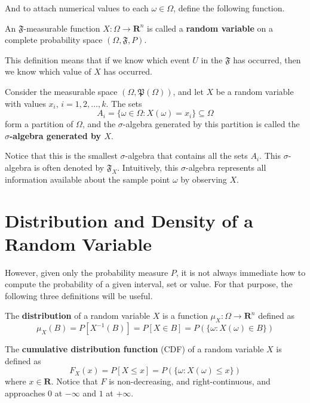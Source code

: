 And to attach numerical values to each $\omega \in \Omega$, define the following function.


\begin{definition}
	An $\mathfrak{F}$-measurable function $X: \Omega \longrightarrow \textbf{R}^n$ is called a \textbf{random variable} on a complete probability space $(\Omega, \mathfrak{F}, P)$. 
\end{definition}

This definition means that if we know which event $U$ in the $\mathfrak{F}$ has occurred, then we know which value of $X$ has occurred. 

Consider the measurable space $(\Omega, \mathfrak{P}(\Omega))$, and let $X$ be a random variable with values $x_i$, $i = 1,2, \ldots, k$. The sets
\[
	A_i = \{ \omega \in \Omega : X(\omega) = x_i \} \subseteq \Omega
\]
form a partition of $\Omega$, and the $\sigma$-algebra generated by this partition is called the \textbf{$\sigma$-algebra generated by $X$}.

Notice that this is the smallest $\sigma$-algebra that contains all the sets $A_i$. This $\sigma$-algebra is often denoted by $\mathfrak{F}_X$. Intuitively, this $\sigma$-algebra represents all information available about the sample point $\omega$ by observing $X$. 


\section{Distribution and Density of a Random Variable}

However, given only the probability measure $P$, it is not always immediate how to compute the probability of a given interval, set or value. For that purpose, the following three definitions will be useful.

\begin{definition}[Distribution]
	The \textbf{distribution} of a random variable $X$ is a function $\mu_X : \Omega \longrightarrow \textbf{R}^n$ defined as
	\[
		\mu_X(B) = P [X^{-1}(B)] = P[X \in B] = P(\{ \omega : X(\omega) \in B \})
	\]
\end{definition}

\begin{definition}
	The \textbf{cumulative distribution function} (CDF) of a random variable $X$ is defined as
	\[
		F_X(x) = P [X \leq x] = P(\{ \omega : X(\omega) \leq x \})
	\]
	where $x \in \textbf{R}$. Notice that $F$ is non-decreasing, and right-continuous, and approaches $0$ at $- \infty$ and $1$ at $+\infty$.
\end{definition}


